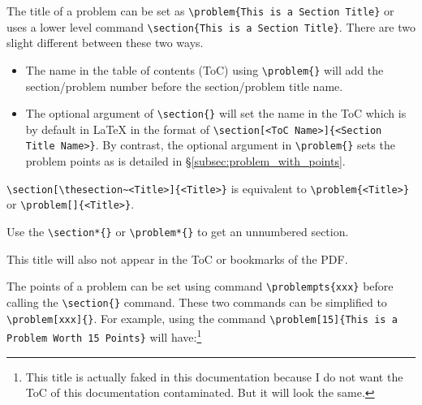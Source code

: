 \documentclass[oneside]{seu-ml-assign}
\begin{document}
      The title of a problem can be set as \verb|\problem{This is a Section Title}| or uses a lower level command \verb|\section{This is a Section Title}|.
      There are two slight different between these two ways.
      \begin{itemize}
        \item The name in the table of contents (ToC) using \verb|\problem{}| will add the section/problem number before the section/problem title name.
        \item The optional argument of \verb|\section{}| will set the name in the ToC which is by default in \LaTeX{} in the format of \verb|\section[<ToC Name>]{<Section Title Name>}|.
        By contrast, the optional argument in \verb|\problem{}| sets the problem points as is detailed in \S\ref{subsec:problem_with_points}.
      \end{itemize}
      \verb|\section[\thesection~<Title>]{<Title>}|
      is equivalent to
      \verb|\problem{<Title>}| or \verb|\problem[]{<Title>}|.
      
      

      Use the \verb|\section*{}| or \verb|\problem*{}| to get an unnumbered section.\vspace{-8mm}


      This title will also not appear in the ToC or bookmarks of the PDF.

    \label{subsec:problem_with_points}

      The points of a problem can be set using command \verb|\problempts{xxx}| before calling the \verb|\section{}| command.
      These two commands can be simplified to \verb|\problem[xxx]{}|.
      For example, using the command \verb|\problem[15]{This is a Problem Worth 15 Points}| will have:\footnote{This title is actually faked in this documentation because I do not want the ToC of this documentation contaminated. But it will look the same.}\vspace{-8mm}
\end{document}
